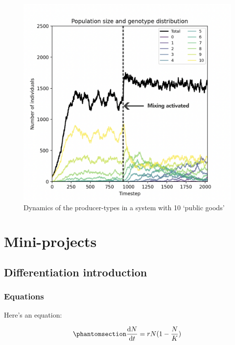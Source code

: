 \documentclass[
  letterpaper,
  DIV=11,
  numbers=noendperiod]{scrreprt}
\theoremstyle{definition}
\theoremstyle{remark}
\begin{document}
\begin{figure}[H]

{\centering \includegraphics{images/evo_pract3_mix.png}

}

\caption{Dynamics of the producer-types in a system with 10 `public
goods'}

\end{figure}%

\part{Mini-projects}

\chapter{Differentiation
introduction}\label{differentiation-introduction-1}

\section{Equations}\label{equations}

Here's an equation:

\begin{equation}\phantomsection\label{eq-log}{ 
\frac{\mathrm{d}N}{\mathrm{d}t} = rN(1 - \frac{N}{K}) 
}\end{equation}
\end{document}
